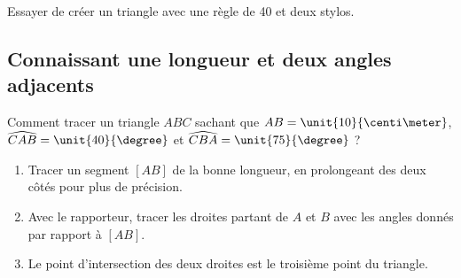 \begin{example}
    Essayer de créer un triangle avec une règle de \unit{40}{\centi\meter} et deux stylos.
\end{example}

\subsection{Connaissant une longueur et deux angles adjacents}



\vspace{2cm}

Comment tracer un triangle \( ABC\) sachant que \( AB=\unit{10}{\centi\meter}\), \( \widehat{CAB}=\unit{40}{\degree}\) et \( \widehat{CBA}=\unit{75}{\degree}\) ?



\begin{enumerate}
    \item
        Tracer un segment $[AB]$ de la bonne longueur, en prolongeant des deux côtés pour plus de précision.

\begin{center}
   
\end{center}
\item
    Avec le rapporteur, tracer les droites partant de \( A\) et \( B\) avec les angles donnés par rapport à \( [AB] \).

\begin{center}
   
\end{center}

\item

    Le point d'intersection des deux droites est le troisième point du triangle.

\begin{center}
   
\end{center}

\end{enumerate}


